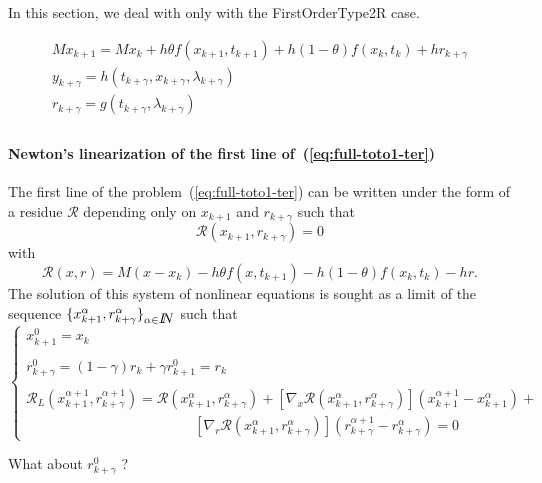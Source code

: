 
In this section, we deal with only with the FirstOrderType2R case.


  \begin{equation}
    \begin{array}{l}
      \label{eq:full-toto1-ter}
      M x_{k+1} = M x_{k} +h \theta f(x_{k+1},t_{k+1}) +h(1-\theta)f(x_{k},t_{k}) + h r_{k+\gamma} \\[2mm]
      y_{k+\gamma} =  h(t_{k+\gamma},x_{k+\gamma},\lambda _{k+\gamma}) \\[2mm]
      r_{k+\gamma} = g(t_{k+\gamma},\lambda_{k+\gamma})\\[2mm]
    \end{array}
\end{equation}

 \paragraph{Newton's linearization of the first line of~(\ref{eq:full-toto1-ter})} The first line of the  problem~(\ref{eq:full-toto1-ter}) can be written under the form of a residue $\mathcal R$ depending only on $x_{k+1}$ and $r_{k+\gamma}$ such that
\begin{equation}
  \label{eq:full-NL3}
  \mathcal R (x_{k+1},r _{k+\gamma}) =0
\end{equation}
with $$\mathcal R(x,r) = M(x - x_{k}) -h\theta f( x , t_{k+1}) - h(1-\theta)f(x_k,t_k) - h r. $$
The solution of this system of nonlinear equations is sought as a limit of the sequence $\{ x^{\alpha}_{k+1},r^{\alpha}_{k+\gamma} \}_{\alpha \in \mbox{\rm $I\!\!N$}}$ such that
 \begin{equation}
   \label{eq:full-NL7}
   \begin{cases}
     x^{0}_{k+1} = x_k \\ \\
     r^{0}_{k+\gamma} = (1-\gamma ) r_{k} + \gamma r^0_{k+1}  = r_k \\ \\
     \mathcal R_L( x^{\alpha+1}_{k+1},r^{\alpha+1}_{k+\gamma}) = \mathcal
     R(x^{\alpha}_{k+1},r^{\alpha}_{k+\gamma})  + \left[ \nabla_{x} \mathcal
     R(x^{\alpha}_{k+1},r^{\alpha}_{k+\gamma})\right] (x^{\alpha+1}_{k+1}-x^{\alpha}_{k+1} ) + \\[2mm]
     \qquad\qquad\qquad\qquad\qquad\qquad\left[ \nabla_{r} \mathcal R(x^{\alpha}_{k+1},r^{\alpha}_{k+\gamma})\right] (r^{\alpha+1}_{k+\gamma} - r^{\alpha}_{k+\gamma} ) =0
 \end{cases}
\end{equation}
\begin{ndrva}
  What about $r^0_{k+\gamma}$ ?
\end{ndrva}

